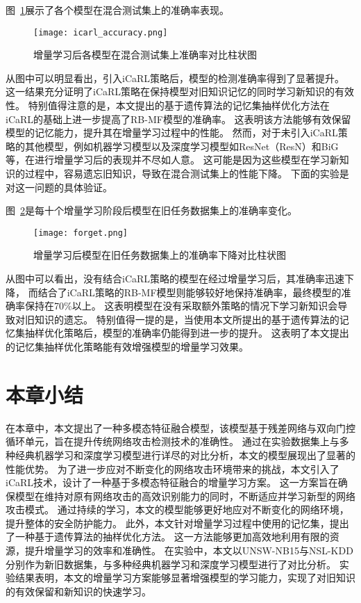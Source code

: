图~\ref{fig:acc_icarl}展示了各个模型在混合测试集上的准确率表现。
\begin{figure}[h]
	\centering
	\texttt{[image: icarl\_accuracy.png]}
	\caption{增量学习后各模型在混合测试集上准确率对比柱状图}
	\label{fig:acc_icarl}
\end{figure}
从图中可以明显看出，引入iCaRL策略后，模型的检测准确率得到了显著提升。
这一结果充分证明了iCaRL策略在保持模型对旧知识记忆的同时学习新知识的有效性。
特别值得注意的是，本文提出的基于遗传算法的记忆集抽样优化方法在iCaRL的基础上进一步提高了RB-MF模型的准确率。
这表明该方法能够有效保留模型的记忆能力，提升其在增量学习过程中的性能。
然而，对于未引入iCaRL策略的其他模型，例如机器学习模型以及深度学习模型如ResNet（ResN）和BiG等，在进行增量学习后的表现并不尽如人意。
这可能是因为这些模型在学习新知识的过程中，容易遗忘旧知识，导致在混合测试集上的性能下降。
下面的实验是对这一问题的具体验证。

图~\ref{fig:acc_forget}是每十个增量学习阶段后模型在旧任务数据集上的准确率变化。
\begin{figure}[h]
	\centering
	\texttt{[image: forget.png]}
	\caption{增量学习后模型在旧任务数据集上的准确率下降对比柱状图}
	\label{fig:acc_forget}
\end{figure}
\par
从图中可以看出，没有结合iCaRL策略的模型在经过增量学习后，其准确率迅速下降，
而结合了iCaRL策略的RB-MF模型则能够较好地保持准确率，最终模型的准确率保持在70\%以上。
这表明模型在没有采取额外策略的情况下学习新知识会导致对旧知识的遗忘。
特别值得一提的是，当使用本文所提出的基于遗传算法的记忆集抽样优化策略后，模型的准确率仍能得到进一步的提升。
这表明了本文提出的记忆集抽样优化策略能有效增强模型的增量学习效果。

\section{本章小结}
在本章中，本文提出了一种多模态特征融合模型，该模型基于残差网络与双向门控循环单元，旨在提升传统网络攻击检测技术的准确性。
通过在实验数据集上与多种经典机器学习和深度学习模型进行详尽的对比分析，本文的模型展现出了显著的性能优势。
为了进一步应对不断变化的网络攻击环境带来的挑战，本文引入了iCaRL技术，设计了一种基于多模态特征融合的增量学习方案。
这一方案旨在确保模型在维持对原有网络攻击的高效识别能力的同时，不断适应并学习新型的网络攻击模式。
通过持续的学习，本文的模型能够更好地应对不断变化的网络环境，提升整体的安全防护能力。
此外，本文针对增量学习过程中使用的记忆集，提出了一种基于遗传算法的抽样优化方法。
这一方法能够更加高效地利用有限的资源，提升增量学习的效率和准确性。
在实验中，本文以UNSW-NB15与NSL-KDD分别作为新旧数据集，与多种经典机器学习和深度学习模型进行了对比分析。
实验结果表明，本文的增量学习方案能够显著增强模型的学习能力，实现了对旧知识的有效保留和新知识的快速学习。
